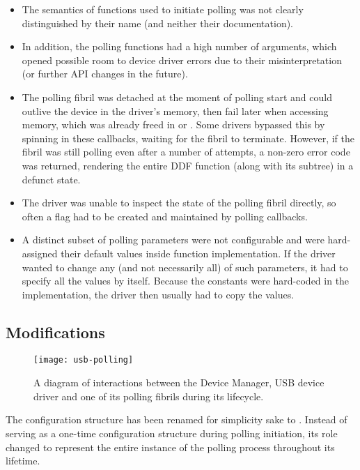 \begin{itemize}
	\item The semantics of functions used to initiate polling was not clearly
		distinguished by their name (and neither their documentation).
	\item In addition, the polling functions had a high number of arguments,
		which opened possible room to device driver errors due to their
		misinterpretation (or further API changes in the future).
	\item The polling fibril was detached at the moment of polling start and
		could outlive the device in the driver's memory, then fail later when
		accessing memory, which was already freed in  or
		. Some drivers bypassed this by spinning in these callbacks,
		waiting for the fibril to terminate. However, if the fibril was still
		polling even after a number of attempts, a non-zero error code was returned,
		rendering the entire DDF function (along with its subtree) in a defunct
		state.
	\item The driver was unable to inspect the state of the polling fibril
		directly, so often a flag had to be created and maintained by polling
		callbacks.
	\item A distinct subset of polling parameters were not configurable and were
		hard-assigned their default values inside function implementation. If the
		driver wanted to change any (and not necessarily all) of such parameters, it
		had to specify all the values by itself. Because the constants were
		hard-coded in the implementation, the driver then usually had to copy the
		values.
\end{itemize}


\subsection{Modifications}

\begin{figure}
	\centering
	\texttt{[image: usb-polling]}
	\caption[USB device polling interactions diagram.]{A diagram of interactions
	between the Device Manager, USB device driver and one of its polling fibrils
	during its lifecycle.}
	\label{fig:usb-polling}
\end{figure}

The configuration structure  has been renamed
for simplicity sake to . Instead of serving as a one-time
configuration structure during polling initiation, its role changed to represent
the entire instance of the polling process throughout its lifetime.

